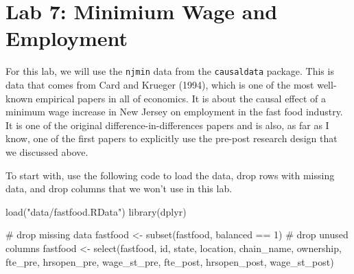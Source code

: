 \documentclass[
  letterpaper,
  DIV=11,
  numbers=noendperiod]{scrreprt}
\newenvironment{Shaded}{\begin{snugshade}}{\end{snugshade}}
\newcommand{\CommentTok}[1]{\textcolor[rgb]{0.37,0.37,0.37}{#1}}
\newcommand{\DecValTok}[1]{\textcolor[rgb]{0.68,0.00,0.00}{#1}}
\newcommand{\FunctionTok}[1]{\textcolor[rgb]{0.28,0.35,0.67}{#1}}
\newcommand{\NormalTok}[1]{\textcolor[rgb]{0.00,0.23,0.31}{#1}}
\newcommand{\OtherTok}[1]{\textcolor[rgb]{0.00,0.23,0.31}{#1}}
\newcommand{\SpecialCharTok}[1]{\textcolor[rgb]{0.37,0.37,0.37}{#1}}
\newcommand{\StringTok}[1]{\textcolor[rgb]{0.13,0.47,0.30}{#1}}
\begin{document}
\section{Lab 7: Minimium Wage and
Employment}\label{lab-7-minimium-wage-and-employment}

For this lab, we will use the \texttt{njmin} data from the
\texttt{causaldata} package. This is data that comes from Card and
Krueger (1994), which is one of the most well-known empirical papers in
all of economics. It is about the causal effect of a minimum wage
increase in New Jersey on employment in the fast food industry. It is
one of the original difference-in-differences papers and is also, as far
as I know, one of the first papers to explicitly use the pre-post
research design that we discussed above.

To start with, use the following code to load the data, drop rows with
missing data, and drop columns that we won't use in this lab.

\begin{Shaded}
\begin{Highlighting}[]
\FunctionTok{load}\NormalTok{(}\StringTok{"data/fastfood.RData"}\NormalTok{)}
\FunctionTok{library}\NormalTok{(dplyr)}

\CommentTok{\# drop missing data}
\NormalTok{fastfood }\OtherTok{\textless{}{-}} \FunctionTok{subset}\NormalTok{(fastfood, balanced }\SpecialCharTok{==} \DecValTok{1}\NormalTok{)}
\CommentTok{\# drop unused columns}
\NormalTok{fastfood }\OtherTok{\textless{}{-}} \FunctionTok{select}\NormalTok{(fastfood, id, state, location, chain\_name, ownership, fte\_pre, hrsopen\_pre, wage\_st\_pre, fte\_post, hrsopen\_post, wage\_st\_post)}
\end{Highlighting}
\end{Shaded}
\end{document}
